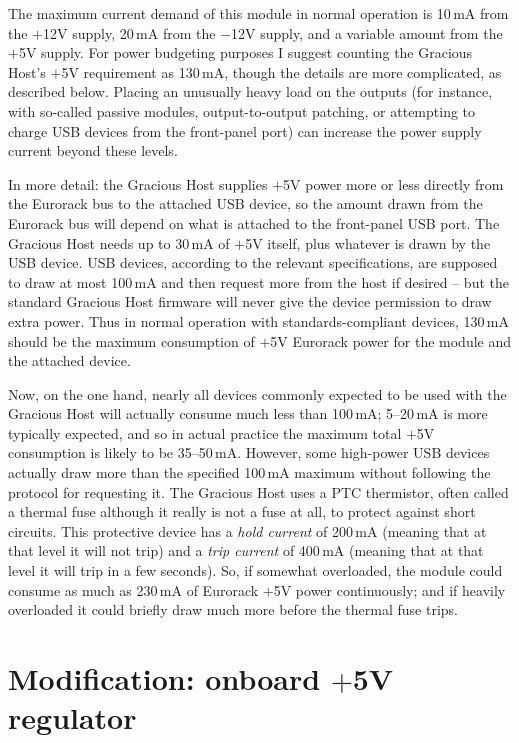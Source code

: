 The maximum current demand of this module in normal operation is 10\,mA from
the $+$12V supply, 20\,mA from the $-$12V supply, and a variable amount from
the $+$5V supply.  For power budgeting purposes I suggest counting the
Gracious Host's $+$5V requirement as 130\,mA, though the details are more
complicated, as described below.  Placing an unusually heavy load on the
outputs (for instance, with so-called passive modules, output-to-output
patching, or attempting to charge USB devices from the front-panel port) can
increase the power supply current beyond these levels.

In more detail:  the Gracious Host supplies $+$5V power more or less
directly from the Eurorack bus to the attached USB device, so the amount
drawn from the Eurorack bus will depend on what is attached to the
front-panel USB port.  The Gracious Host needs up to 30\,mA of $+$5V itself,
plus whatever is drawn by the USB device.  USB devices, according to the
relevant specifications, are supposed to draw at most 100\,mA and then
request more from the host if desired -- but the standard Gracious Host
firmware will never give the device permission to draw extra power.  Thus in
normal operation with standards-compliant devices, 130\,mA should be the
maximum consumption of $+$5V Eurorack power for the module and the attached
device.

Now, on the one hand, nearly all devices commonly expected to be used with
the Gracious Host will actually consume much less than 100\,mA; 5--20\,mA is
more typically expected, and so in actual practice the maximum total $+$5V
consumption is likely to be 35--50\,mA.  However, some high-power USB
devices actually draw more than the specified 100\,mA maximum without
following the protocol for requesting it.  The Gracious Host uses a PTC
thermistor, often called a thermal fuse although it really is not a fuse at
all, to protect against short circuits.  This protective device has a
\emph{hold current} of 200\,mA (meaning that at that level it will
not trip) and a \emph{trip current} of 400\,mA (meaning that at that level
it will trip in a few seconds).  So, if somewhat overloaded, the module
could consume as much as 230\,mA of Eurorack $+$5V power continuously; and
if heavily overloaded it could briefly draw much more before the thermal
fuse trips.

\section{Modification:  onboard $+$5V regulator}

